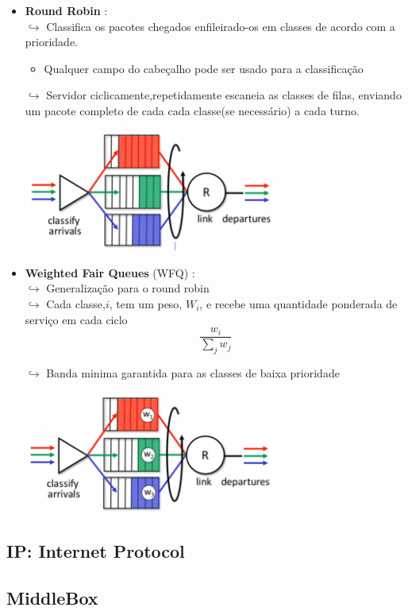 \begin{itemize}[left=0.5cm, align=left, nosep]
                \item \textbf{Round Robin} : \\
                    $\hookrightarrow$ Classifica os pacotes chegados enfileirado-os em classes de acordo com a prioridade. 
                        \begin{itemize}[left=0.5cm, align=left, nosep]
                            \item Qualquer campo do cabeçalho pode ser usado para a classificação
                        \end{itemize}      
                    $\hookrightarrow$ Servidor ciclicamente,repetidamente escaneia as classes de filas, enviando um pacote completo de cada cada classe(se necessário) a cada turno. 
                    
                    \begin{center}
                        \includegraphics[width=0.65\textwidth]{img/cap-04/round-robin.png}
                    \end{center}
                    
                \item \textbf{Weighted Fair Queues} (WFQ) : \\
                    $\hookrightarrow$ Generalização para o round robin \\
                    $\hookrightarrow$ Cada classe,$i$, tem um peso, $W_i$, e recebe uma quantidade ponderada de serviço em cada ciclo
                        \[
                            \frac{w_i}{\sum_{j}^{} w_j}  
                        \]    
                    
                    $\hookrightarrow$ Banda minima garantida para as classes de baixa prioridade 
                    
                    \begin{center}
                        \includegraphics[width=0.65\textwidth]{img/cap-04/wfq.png}
                    \end{center}
            
            \end{itemize} 

    \subsection{IP: Internet Protocol}
    
    \subsection{MiddleBox}

